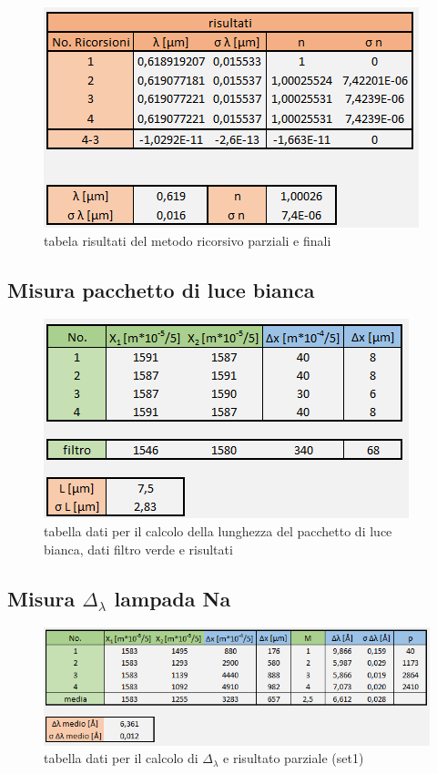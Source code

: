 \documentclass{article}
\begin{document}
\begin{figure}[h!]
  \centering
  \includegraphics[width=0.6\linewidth]{IM tabella ricorsione}
  \caption{tabela risultati del metodo ricorsivo parziali e finali}
\end{figure}

\subsection{Misura pacchetto di luce bianca}

\begin{figure}[h!]
  \centering
  \includegraphics[width=0.6\linewidth]{IM tabella pacchetto}
  \caption{tabella dati per il calcolo della lunghezza del pacchetto di luce bianca, dati filtro verde e risultati}
\end{figure}

\subsection{Misura $\Delta_\lambda$ lampada Na}

\begin{figure}[h!]
  \centering
  \includegraphics[width=0.75\linewidth]{IM tabella delta lambda set 1}
  \caption{tabella dati per il calcolo di $\Delta_\lambda$ e risultato parziale (set1)}
\end{figure}
\end{document}
